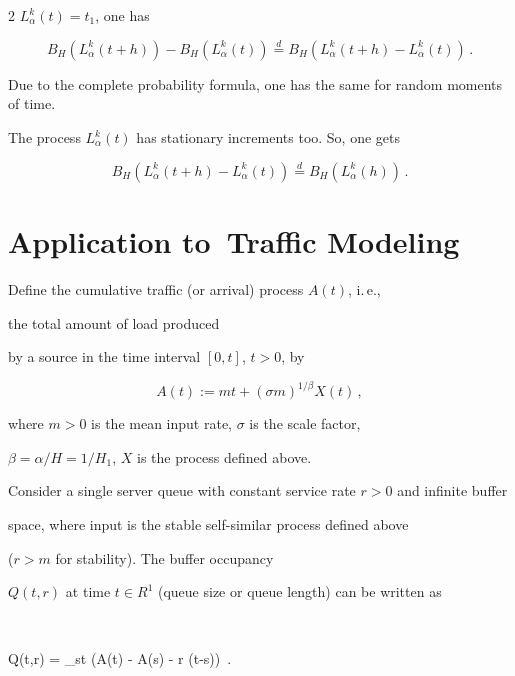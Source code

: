 \begin{multicols}{2}
$L_{\alpha}^k (t) = t_1$, one has 

$$

B_H (L_{\alpha}^k (t+h)) - B_H (L_{\alpha}^k (t)) \stackrel{d}{=} 

B_H (L_{\alpha}^k (t+h) -  L_{\alpha}^k (t)) \,. 

$$ 

Due to the complete probability formula, one has the same for random moments of time. 

The process $L_{\alpha}^k (t)$ has stationary increments too. So, one gets  

$$

B_H (L_{\alpha}^k (t+h) -  L_{\alpha}^k (t))  

\stackrel{d}{=} 

B_H (L_{\alpha}^k (h) ) \,.

$$ 





\section{Application to~Traffic Modeling} 



\noindent

Define the cumulative traffic (or arrival) process $A(t)$, i.\,e.,

the total amount of load produced 

by a source in the time interval $[0,t]$, $t>0$, by 

$$

A(t) := mt + (\sigma m)^{1/\beta} X(t) \,, 

$$

where $m>0$ is the mean input rate, $\sigma$ is the scale factor, 

$\beta = \alpha/H = 1/H_1$, $X$ is the process defined above. 





Consider a single server queue with constant service rate $r>0$ and infinite buffer 

space, where input is the stable self-similar process defined above 

($r>m$ for stability). The buffer occupancy 

$Q(t,r)$ at time $t\in R^1$ (queue size or queue length) can be written as 

$$

Q(t,r) = \sup\limits_{s\leq t} (A(t) - A(s) - r (t-s)) \,.


\end{multicols}
